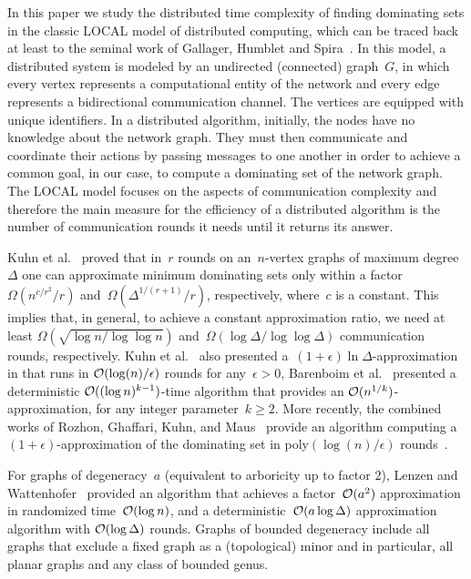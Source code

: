 \medskip
In this paper we study the distributed time complexity of finding
dominating sets in the classic LOCAL model of distributed computing,
which can be traced back at least to the seminal work of Gallager,
Humblet and Spira~\cite{gallager1983distributed}. In this model, a
distributed system is modeled by an undirected (connected) graph~$G$,
in which every vertex represents a computational entity of the network and every edge represents a bidirectional communication channel. The vertices are equipped with unique identifiers.
In a distributed algorithm, initially, the nodes have no knowledge about
the network graph. They must then communicate and coordinate
their actions by passing messages to one another in order to achieve
a common goal, in our case, to compute a dominating set of the
network graph. The LOCAL model focuses on the aspects of
communication complexity and therefore the main measure for
the efficiency of a distributed algorithm is the number of communication
rounds it needs until it returns its answer.

Kuhn et al.~\cite{KuhnMW16} proved that in~$r$ rounds on an~$n$-vertex graphs of maximum degree
$\Delta$ one can approximate minimum dominating sets only within a factor $\Omega(n^{c/r^2}/r)$
and~$\Omega(\Delta^{1/(r+1)}/r)$, respectively, where~$c$ is a constant.
This implies that, in general, to achieve a constant approximation ratio,
we need at least $\Omega(\sqrt{\log
    n/\log \log n})$ and~$\Omega(\log \Delta/\log \log \Delta)$ communication rounds, respectively.
Kuhn et al.~\cite{KuhnMW16} also presented a~$(1+\epsilon)\ln \Delta$-approximation in that runs in $\mathcal{O}(\log(n)/\epsilon)$ rounds for any~$\epsilon>0$,
Barenboim et al.~\cite{barenboim2018fast}
presented a deterministic $\mathcal{O}((\log n)^{k-1})$-time algorithm that provides an
$\mathcal{O}(n^{1/k})$-approximation, for any integer parameter~$k \ge 2$.
More recently, the combined works of Rozhon, Ghaffari, Kuhn, and Maus~\cite{DBLP:conf/stoc/GhaffariKM17,DBLP:conf/stoc/RozhonG20}
provide an algorithm computing a $(1+\epsilon)$-approximation of the dominating set
in poly$(\log(n)/\epsilon)$ rounds~\cite[Corollary 3.11]{DBLP:conf/stoc/RozhonG20}. 

For graphs of degeneracy~$a$ (equivalent to arboricity up to factor $2$),
Lenzen and Wattenhofer~\cite{lenzen2010minimum}
provided an algorithm that achieves a factor~$\mathcal{O}(a^2)$ approximation
in randomized time~$\mathcal{O}(\log n)$, and a deterministic~$\mathcal{O}(a \log
\Delta)$ approximation algorithm
with $\mathcal{O}(\log \Delta)$ rounds. Graphs of bounded degeneracy include all graphs that exclude a fixed graph as a (topological) minor and in particular, all planar graphs and any class of bounded genus.

